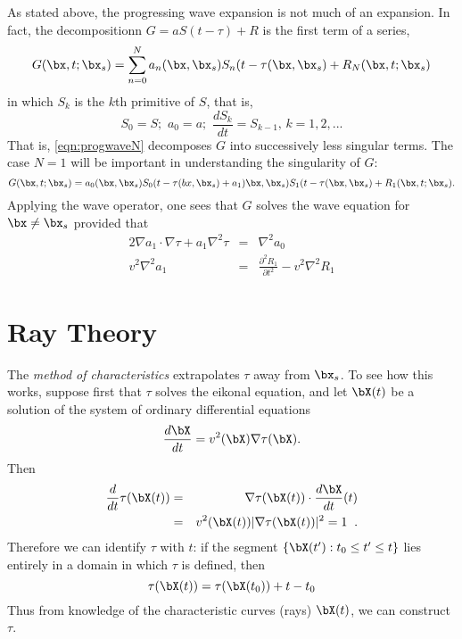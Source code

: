 As stated above, the progressing wave expansion is not much of an
expansion. In fact, the decompositionn $G = aS(t-\tau)+R$ is the first
term of a series, 
\begin{equation}
\label{eqn:progwaveN}
G(\bx,t;\bx_s) = \sum_{n=0}^N a_n(\bx,\bx_s) S_n(t-\tau(\bx,\bx_s)  + R_N(\bx,t;\bx_s)
\end{equation}
in which $S_k$ is the $k$th primitive of $S$, that is,
\[
S_0 = S;\,\, a_0=a;\,\,\frac{dS_k}{dt} = S_{k-1}, \,k=1,2,...
\]
That is, \ref{eqn:progwaveN} decomposes $G$ into successively less
singular terms. The case $N=1$ will be important in understanding the
singularity of $G$:
\begin{equation}
\label{eqn:progwave1}
G(\bx,t;\bx_s) = a_0(\bx,\bx_s) S_0(t-\tau(bx,\bx_s) +
a_1)\bx,\bx_s)S_1(t-\tau(\bx,\bx_s) + R_1(\bx,t;\bx_s).
\end{equation}
Applying the wave operator, one sees that $G$ solves the wave equation
for $\bx \ne \bx_s$ provided that
\begin{eqnarray}
\label{eqn:transp1}
2\nabla a_1 \cdot \nabla \tau + a_1 \nabla^2 \tau &=& \nabla^2 a_0 \nonumber \\
v^2 \nabla^2 a_1 & = & \frac {\partial ^2 R_1}{\partial t^2} -  v^2 \nabla^2 R_1
\end{eqnarray}
\section{Ray Theory}

The {\em method of characteristics} extrapolates $\tau$ away from $\bx_s$. To see how this works,
suppose first that $\tau$ solves the eikonal equation, and let $\bX(t)$
be a solution of the system of ordinary differential equations
\begin{equation}
\label{eqn:xeqn}
\frac{d\bX}{dt} = v^2(\bX) \nabla\tau(\bX).
\end{equation}
Then
\begin{eqnarray}
\frac{d}{dt} \tau (\bX(t)) & = & \nabla\tau(\bX(t))\cdot
\frac{d\bX}{dt}(t)\\
& = & v^2(\bX(t)) |\nabla\tau(\bX(t))|^2 = 1 \;\;.
\end{eqnarray}
Therefore we can identify $\tau$ with $t$: 
if the segment $\{\bX(t'):t_0 \le t' \le t\}$
lies entirely in a domain in which $\tau$ is defined, then
\begin{equation}
\label{eqn:tausig}
\tau(\bX(t)) = \tau(\bX(t_0)) + t - t_0
\end{equation}
Thus from knowledge of the characteristic curves (rays) $\bX(t)$, we can
construct $\tau$.  

